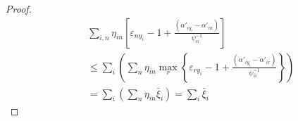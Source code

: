 \begin{proof}
\begin{eqnarray}
&&\sum\limits_{i,n} {{\eta _{in}}\left[ { {\varepsilon _{n{y_i}}}-1 + \frac{{\left( {{{\alpha '}_{i{y_i}}} - {{\alpha '}_{in}}} \right)}}{{\psi_{ii}^{ - 1}}}} \right]} \nonumber\\ &&\le \sum\limits_i {\left( {\sum\limits_n {{\eta _{in}}\mathop {\max }\limits_r \left\{ { {\varepsilon _{r{y_i}}} -1 + \frac{{\left( {{{\alpha '}_{i{y_i}}} - {{\alpha '}_{ir}}} \right)}}{{\psi_{ii}^{ - 1}}}} \right\}} } \right)}  \nonumber\\
&&= \sum\limits_i {\left( {\sum\limits_n {{\eta _{in}}{{\bar \xi }_i}} } \right)}  = \sum\limits_i {\bar \xi_i }
\end{eqnarray}
\end{proof}